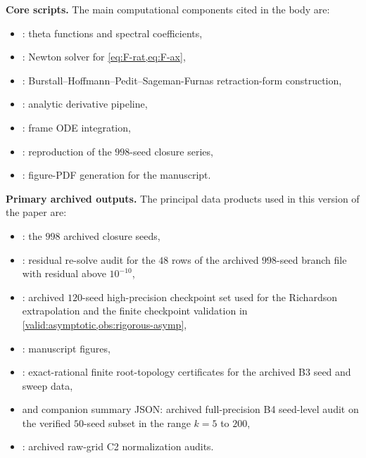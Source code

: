 \documentclass[11pt,a4paper]{article}
\theoremstyle{plain}
\theoremstyle{definition}
\theoremstyle{remark}
\begin{document}
\noindent\textbf{Core scripts.}
The main computational components cited in the body are:
\begin{itemize}[nosep]
\item {}: theta functions and spectral coefficients,
\item {}: Newton solver for
  \cref{eq:F-rat,eq:F-ax},
\item {}: Burstall--Hoffmann--Pedit--Sageman-Furnas
  retraction-form construction,
\item {}: analytic derivative pipeline,
\item {}: frame ODE integration,
\item {}: reproduction of the $998$-seed closure series,
\item {}: figure-PDF generation for the manuscript.
\end{itemize}

\noindent\textbf{Primary archived outputs.}
The principal data products used in this version of the paper are:
\begin{itemize}[nosep]
\item {}:
  the $998$ archived closure seeds,
\item {}:
  residual re-solve audit for the $48$ rows of the archived
  $998$-seed branch file with residual above $10^{-10}$,
\item {}:
  archived $120$-seed high-precision checkpoint set used for the
  Richardson extrapolation and the finite checkpoint validation in
  \cref{valid:asymptotic,obs:rigorous-asymp},
\item {}: manuscript figures,
\item {}: exact-rational finite
  root-topology certificates for the archived B3 seed and sweep data,
\item {}
  and companion summary JSON: archived full-precision B4 seed-level audit on
  the verified $50$-seed subset in the range $k=5$ to $200$,
\item {}: archived raw-grid C2 normalization audits.
\end{itemize}
\end{document}
